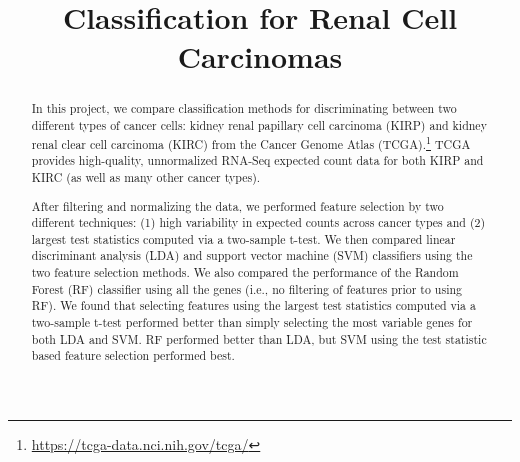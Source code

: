 



\begin{frontmatter}

\title{Classification for Renal Cell Carcinomas}



\begin{abstract}

In this project, we compare classification methods for discriminating between
two different types of cancer cells: kidney renal papillary cell carcinoma (KIRP) and
kidney renal clear cell carcinoma (KIRC) from the Cancer Genome Atlas
(TCGA).\footnote{\url{https://tcga-data.nci.nih.gov/tcga/}} TCGA provides
high-quality, unnormalized RNA-Seq expected count data for both KIRP and KIRC
(as well as many other cancer types).  

After filtering and normalizing the data, we performed feature selection by two
different techniques:  (1) high variability in expected counts across cancer
types and (2) largest test statistics computed via a two-sample t-test.  We then
compared linear discriminant analysis (LDA) and support vector machine (SVM)
classifiers using the two feature selection methods.  We also compared the
performance of the Random Forest (RF) classifier using all the genes (i.e., no
filtering of features prior to using RF).
We found that selecting features using the largest test statistics computed via
a two-sample t-test performed better than simply selecting the most variable
genes for both LDA and SVM.  RF performed better than LDA, but SVM using
the test statistic based feature selection performed best.

\end{abstract}

\begin{keyword}
\end{keyword}

\end{frontmatter}



